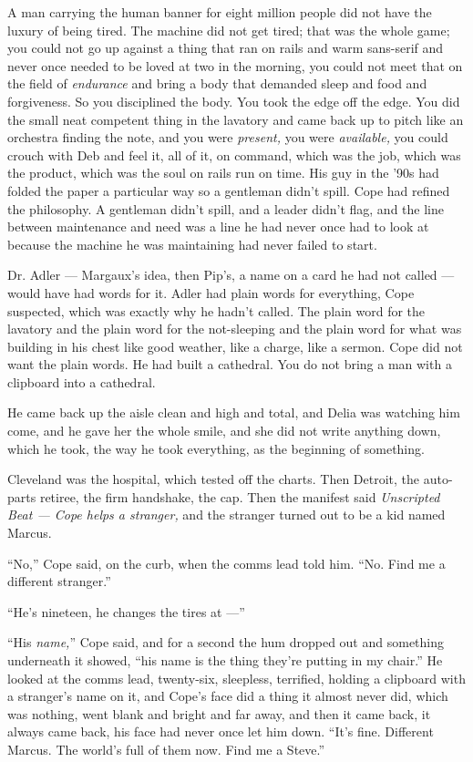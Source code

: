 \documentclass[11pt,openany]{book}
\newcommand{\scenebreak}{\par\vspace{0.5\baselineskip}\begin{center}\textasteriskcentered\quad\textasteriskcentered\quad\textasteriskcentered\end{center}\vspace{0.5\baselineskip}\par}
\begin{document}
A man carrying the human banner for eight million people did not have the luxury of being tired. The machine did not get tired; that was the whole game; you could not go up against a thing that ran on rails and warm sans-serif and never once needed to be loved at two in the morning, you could not meet that on the field of \textit{endurance} and bring a body that demanded sleep and food and forgiveness. So you disciplined the body. You took the edge off the edge. You did the small neat competent thing in the lavatory and came back up to pitch like an orchestra finding the note, and you were \textit{present,} you were \textit{available,} you could crouch with Deb and feel it, all of it, on command, which was the job, which was the product, which was the soul on rails run on time. His guy in the '90s had folded the paper a particular way so a gentleman didn't spill. Cope had refined the philosophy. A gentleman didn't spill, and a leader didn't flag, and the line between maintenance and need was a line he had never once had to look at because the machine he was maintaining had never failed to start.

Dr. Adler --- Margaux's idea, then Pip's, a name on a card he had not called --- would have had words for it. Adler had plain words for everything, Cope suspected, which was exactly why he hadn't called. The plain word for the lavatory and the plain word for the not-sleeping and the plain word for what was building in his chest like good weather, like a charge, like a sermon. Cope did not want the plain words. He had built a cathedral. You do not bring a man with a clipboard into a cathedral.

He came back up the aisle clean and high and total, and Delia was watching him come, and he gave her the whole smile, and she did not write anything down, which he took, the way he took everything, as the beginning of something.


\scenebreak


Cleveland was the hospital, which tested off the charts. Then Detroit, the auto-parts retiree, the firm handshake, the cap. Then the manifest said \textit{Unscripted Beat --- Cope helps a stranger,} and the stranger turned out to be a kid named Marcus.

``No,'' Cope said, on the curb, when the comms lead told him. ``No. Find me a different stranger.''

``He's nineteen, he changes the tires at ---''

``His \textit{name,}'' Cope said, and for a second the hum dropped out and something underneath it showed, ``his name is the thing they're putting in my chair.'' He looked at the comms lead, twenty-six, sleepless, terrified, holding a clipboard with a stranger's name on it, and Cope's face did a thing it almost never did, which was nothing, went blank and bright and far away, and then it came back, it always came back, his face had never once let him down. ``It's fine. Different Marcus. The world's full of them now. Find me a Steve.''
\end{document}
